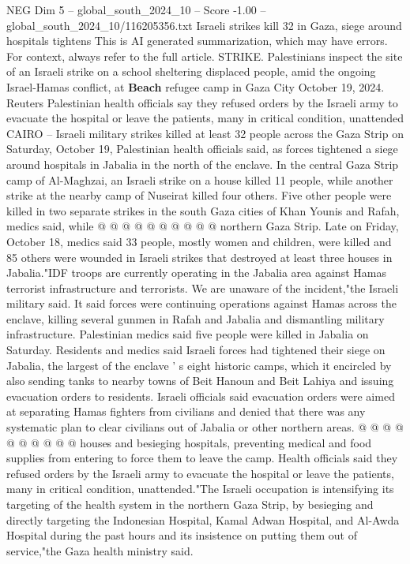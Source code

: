 \begin{textsample}{NEG Dim 5 – global\_south\_2024\_10 – Score -1.00 – global\_south\_2024\_10/116205356.txt}  \label{ex:f5_neg_136}
Israeli strikes kill 32 in Gaza, siege around hospitals tightens This is AI generated summarization, which may have errors.
For context, always refer to the full article.
STRIKE.
Palestinians inspect the site of an Israeli strike on a school sheltering displaced people, amid the ongoing Israel-Hamas conflict, at \textbf{Beach} refugee camp in Gaza City October 19, 2024.
Reuters Palestinian health officials say they refused orders by the Israeli army to evacuate the hospital or leave the patients, many in critical condition, unattended CAIRO -- Israeli military strikes killed at least 32 people across the Gaza Strip on Saturday, October 19, Palestinian health officials said, as forces tightened a siege around hospitals in Jabalia in the north of the enclave.
In the central Gaza Strip camp of Al-Maghzai, an Israeli strike on a house killed 11 people, while another strike at the nearby camp of Nuseirat killed four others.
Five other people were killed in two separate strikes in the south Gaza cities of Khan Younis and Rafah, medics said, while @ @ @ @ @ @ @ @ @ @ northern Gaza Strip.
Late on Friday, October 18, medics said 33 people, mostly women and children, were killed and 85 others were wounded in Israeli strikes that destroyed at least three houses in Jabalia."IDF troops are currently operating in the Jabalia area against Hamas terrorist infrastructure and terrorists.
We are unaware of the incident,"the Israeli military said.
It said forces were continuing operations against Hamas across the enclave, killing several gunmen in Rafah and Jabalia and dismantling military infrastructure.
Palestinian medics said five people were killed in Jabalia on Saturday.
Residents and medics said Israeli forces had tightened their siege on Jabalia, the largest of the enclave ' s eight historic camps, which it encircled by also sending tanks to nearby towns of Beit Hanoun and Beit Lahiya and issuing evacuation orders to residents.
Israeli officials said evacuation orders were aimed at separating Hamas fighters from civilians and denied that there was any systematic plan to clear civilians out of Jabalia or other northern areas. @ @ @ @ @ @ @ @ @ @ houses and besieging hospitals, preventing medical and food supplies from entering to force them to leave the camp.
Health officials said they refused orders by the Israeli army to evacuate the hospital or leave the patients, many in critical condition, unattended."The Israeli occupation is intensifying its targeting of the health system in the northern Gaza Strip, by besieging and directly targeting the Indonesian Hospital, Kamal Adwan Hospital, and Al-Awda Hospital during the past hours and its insistence on putting them out of service,"the Gaza health ministry said.

\end{textsample}
